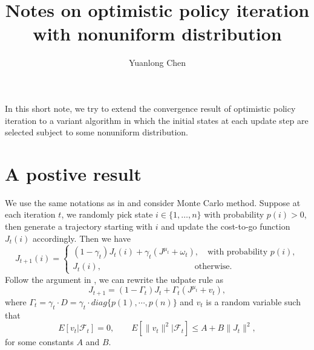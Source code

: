 \documentclass[12pt,a4paper]{amsart}
\numberwithin{equation}{section}
\theoremstyle{plain}
\theoremstyle{definition}
\begin{document}
\title[nonuniforme]{Notes on optimistic policy iteration with nonuniform distribution}


\author[Y. Chen]{Yuanlong Chen}

\address{University of Washington, Seattle} 



















\maketitle





In this short note, we try to extend the convergence result of optimistic policy iteration to a variant algorithm in which the initial states at each update step are selected subject to some nonuniform distribution. 

\section{A postive result}
We use the same notations as in \cite{Ts03} and consider Monte Carlo method. Suppose at each iteration $t$, we randomly pick state $i \in \{1, \dots , n\}$ with probability $p(i) > 0$, then generate a trajectory starting with $i$ and update the  cost-to-go function $J_t(i)$ accordingly. Then we have
$$
J_{t+1}(i)=\left\{
\begin{array}{ll}
(1-\gamma_t) J_t(i) + \gamma_t(J^{\mu_t} + \omega_t), \quad \text{with probability } p(i),  \\
J_t(i), \qquad  \qquad \qquad \qquad  \qquad \quad \text{otherwise.}
\end{array}
\right.
$$
Follow the argument in \cite{Ts03}, we can rewrite the udpate rule as 
$$
J_{t+1}  = (1-\Gamma_t) J_t + \Gamma_t (J^{\mu_t} + v_t),
$$
where $\Gamma_t =\gamma_t\cdot D =  \gamma_t \cdot diag \{ p(1), \cdots, p(n)\}$ and $v_t$ is a random variable such that 
$$
E[v_t | \mathcal{F}_t]  = 0, \qquad E[\|v_t\|^2 | \mathcal{F}_t] \le A + B\|J_t\|^2,
$$
for some constants $A$ and $B$.
\end{document}
